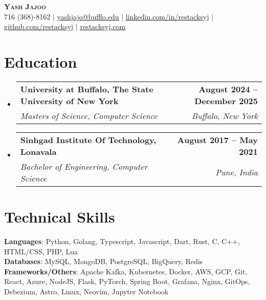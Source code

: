 \documentclass[letterpaper,11pt]{article}
\makeatletter
\newcommand{\resumeSubheading}[4]{
  \vspace{-2pt}\item
    \begin{tabular*}{0.97\textwidth}[t]{l@{\extracolsep{\fill}}r}
        \textbf{#1} & \textbf{#2} \\
      \textit{\small#3} & \textit{\small #4} \\
    \end{tabular*}\vspace{-7pt}
}
\newcommand{\resumeSubHeadingListStart}{\begin{itemize}[leftmargin=0.15in, label={}]}
\newcommand{\resumeSubHeadingListEnd}{\end{itemize}}
\makeatother
\begin{document}

\begin{center}
    \textbf{\Huge \scshape Yash Jajoo} \\ \vspace{1pt}
    \small 716 (368)-8162 $|$ \href{mailto:yashjajo@buffalo.edu}{\underline{yashjajo@bufflo.edu}} $|$ 
    \href{https://linkedin.com/in/restacksyj}{\underline{linkedin.com/in/restacksyj}} $|$
    \href{https://github.com/restacksyj}{\underline{github.com/restacksyj}} $|$
    \href{https://restacksyj.com}{\underline{restacksyj.com}} 
\end{center}


\section{Education}
  \resumeSubHeadingListStart
    \resumeSubheading
      {University at Buffalo, The State University of New York}{August 2024 -- December 2025}
      {Masters of Science, Computer Science}{Buffalo, New York}
    \resumeSubheading
      {Sinhgad Institute Of Technology, Lonavala}{August 2017 -- May 2021}
      {Bachelor of Engineering, Computer Science}{Pune, India}
  \resumeSubHeadingListEnd


\section{Technical Skills}
 \begin{itemize}[leftmargin=0.15in, label={}]
    \small{\item{
            \textbf{Languages}{: Python, Golang, Typescript, Javascript, Dart, Rust, C, C++, HTML/CSS, PHP, Lua } \\ \textbf{Databases}{: MySQL, MongoDB, PostgreSQL, BigQuery, Redis} \\ \textbf{Frameworks/Others}{: Apache Kafka, Kubernetes, Docker, AWS, GCP, Git, React, Azure, NodeJS, Flask, PyTorch, Spring Boot, Grafana, Nginx, GitOps, Debezium, Astro, Linux, Neovim, Jupyter Notebook }}}
 \end{itemize}
\end{document}
